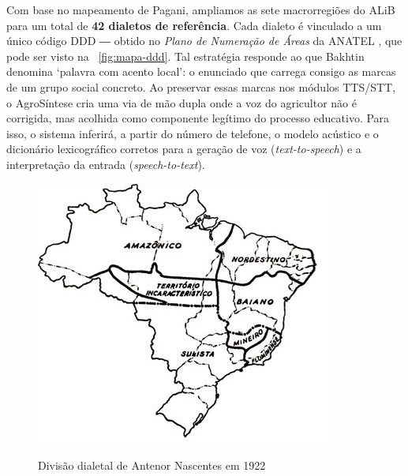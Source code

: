 Com base no mapeamento de Pagani, ampliamos as sete macrorregiões do
ALiB para um total de \textbf{42 dialetos de referência}.
Cada dialeto é vinculado a um único código DDD ― obtido no
\textit{Plano de Numeração de Áreas} da ANATEL \cite{anatel_pnb}, que pode ser visto na  ~\ref{fig:mapa-ddd}.
Tal estratégia responde ao que Bakhtin \cite{bakhtin1981marxismo} denomina ‘palavra com acento local’: o enunciado que carrega consigo as marcas de um grupo social concreto. Ao preservar essas marcas nos módulos TTS/STT, o AgroSíntese cria uma via de mão dupla onde a voz do agricultor não é corrigida, mas acolhida como componente legítimo do processo educativo.
Para isso, o sistema inferirá, a partir do número de telefone, o modelo acústico
e o dicionário lexicográfico corretos para a geração de voz
(\textit{text-to-speech}) e a interpretação da entrada (\textit{speech-to-text}).


\begin{figure}[h]
	\centering
	\caption{Divisão dialetal de Antenor Nascentes em 1922}
	\includegraphics[width=1\linewidth,scale=1.0]{images/mapa-alib.jpg}
	\label{fig:mapa-alib}
\end{figure}


